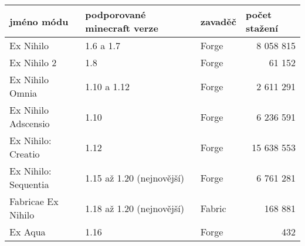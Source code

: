 \documentclass[FM,RP]{tulthesis}
\begin{document}
\begin{table}[]
\begin{tabular}{lllr}
\hline
\multicolumn{1}{|l|}{jméno módu} & \multicolumn{1}{l|}{podporované minecraft verze} & \multicolumn{1}{l|}{zavaděč} & \multicolumn{1}{l|}{počet stažení} \\ \hline
Ex Nihilo                        & 1.6 a 1.7                                        & Forge                        & 8 058 815                          \\
Ex Nihilo 2                      & 1.8                                              & Forge                        & 61 152                             \\
Ex Nihilo Omnia                  & 1.10 a 1.12                                      & Forge                        & 2 611 291                          \\
Ex Nihilo Adscensio              & 1.10                                             & Forge                        & 6 236 591                          \\
Ex Nihilo: Creatio               & 1.12                                             & Forge                        & 15 638 553                         \\
Ex Nihilo: Sequentia             & 1.15 až 1.20 (nejnovější)                        & Forge                        & 6 761 281                          \\
Fabricae Ex Nihilo               & 1.18 až 1.20 (nejnovější)                        & Fabric                       & 168 881                            \\
Ex Aqua                          & 1.16                                             & Forge                        & 432                               
\end{tabular}
\end{table}
        
        

\begin{comment}
    Můj mod je inspirován \textit{Ex Nihilo} módem. \textit{Ex Nihilo} je populární mód, který umožnuje získávat hráčům předměty z ničeho, skrz automatizaci a recyklaci. \textit{Ex Nihilo} je často používán společně s jinými módy v žánru \textit{skyblock}. V tomto žánru se hráč nachází na malém ostrově tvořeného z malého množství základních bloků. Jeho cílem je využít jeho omezené zdroje k získání nových zdrojů a rozšíření ostrovu. Většinou ostrov obsahuje hlínu a strom, který hráč může pokácet a poté znovu zasadit, čímž získá teoreticky nekonečné množství dřeva a listí. Ex Nihilo přidává do hry kompostér a sívky. Kompostér umožnuje hráči předělat listí na hlínu, Sívky umožnují hráči přesívat hlínu na rudy.
\end{comment}
\end{document}
